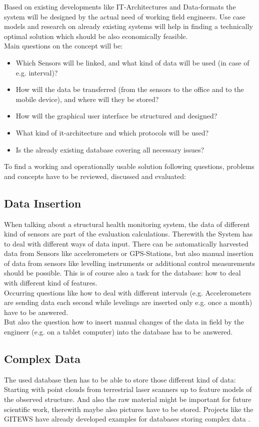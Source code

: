 Based on existing developments like IT-Architectures and Data-formats the system will be designed by the actual need of working field engineers. Use case models and research on already existing systems will help in finding a technically optimal solution which should be also economically feasible.\\
Main questions on the concept will be:
\begin{itemize}
\item Which Sensors will be linked, and what kind of data will be used (in case of e.g. interval)?
\item How will the data be transferred (from the sensors to the office and to the mobile device), and where will they be stored?
\item How will the graphical user interface be structured and designed?
\item What kind of it-architecture and which protocols will be used?
\item Is the already existing database covering all necessary issues?
\end{itemize}
To find a working and operationally usable solution following questions, problems and concepts have to be reviewed, discussed and evaluated:\\
\subsection{Data Insertion}
When talking about a structural health monitoring system, the data of different kind of sensors are part of the evaluation calculations. Therewith the System has to deal with different ways of data input. There can be automatically harvested data from Sensors like accelerometers or GPS-Stations, but also manual insertion of data from sensors like levelling instruments or additional control measurements should be possible. This is of course also a task for the database: how to deal with different kind of features.\\
Occurring questions like how to deal with different intervals (e.g. Accelerometers are sending data each second while levelings are inserted only e.g. once a month) have to be answered.\\
But also the question how to insert manual changes of the data in field by the engineer (e.g. on a tablet computer) into the database has to be answered.
\subsection{Complex Data}
The used database then has to be able to store those different kind of data: Starting with point clouds from terrestrial laser scanners up to feature models of the observed structure. And also the raw material might be important for future scientific work, therewith maybe also pictures have to be stored. Projects like the GITEWS have already developed examples for databases storing complex data \citep{strobl_geodatenmanagement_2007}.

